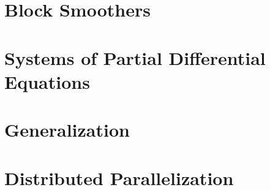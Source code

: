 \section{Block Smoothers}
\section{Systems of Partial Differential Equations}
\section{Generalization}
\section{Distributed Parallelization}